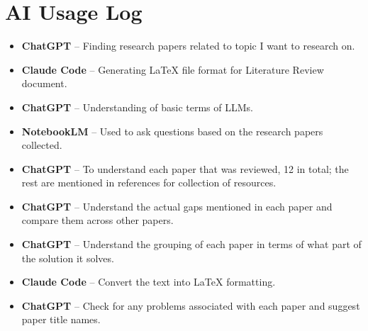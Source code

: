 \documentclass[12pt, a4paper]{article}
\begin{document}
\section{AI Usage Log}

\begin{itemize}
    \item \textbf{ChatGPT} -- Finding research papers related to topic I want to research on.
    \item \textbf{Claude Code} -- Generating LaTeX file format for Literature Review document.
    \item \textbf{ChatGPT} -- Understanding of basic terms of LLMs.
    \item \textbf{NotebookLM} -- Used to ask questions based on the research papers collected.
    \item \textbf{ChatGPT} -- To understand each paper that was reviewed, 12 in total; the rest are mentioned in references for collection of resources.
    \item \textbf{ChatGPT} -- Understand the actual gaps mentioned in each paper and compare them across other papers.
    \item \textbf{ChatGPT} -- Understand the grouping of each paper in terms of what part of the solution it solves.
    \item \textbf{Claude Code} -- Convert the text into LaTeX formatting.
    \item \textbf{ChatGPT} -- Check for any problems associated with each paper and suggest paper title names.
\end{itemize}
\end{document}
